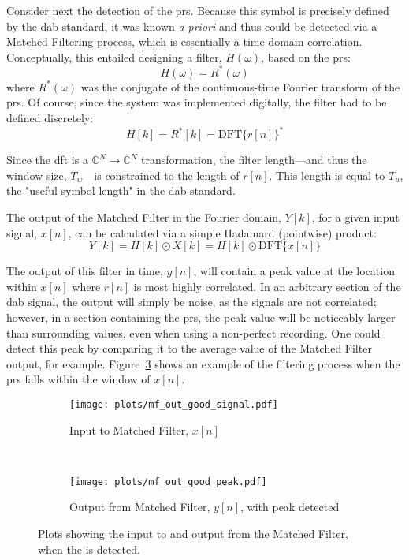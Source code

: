 \documentclass[class=report,11pt,crop=false]{standalone}
\begin{document}
Consider next the detection of the \gls{prs}. Because this symbol is precisely defined by the \gls{dab} standard, it was known \emph{a priori} and thus could be detected via a Matched Filtering process, which is essentially a time-domain correlation. Conceptually, this entailed designing a filter, \(H(\omega)\), based on the \gls{prs}:
\begin{equation}
  H(\omega) = R^*(\omega)
\end{equation}
where \(R^*(\omega)\) was the conjugate of the continuous-time Fourier transform of the \gls{prs}. Of course, since the system was implemented digitally, the filter had to be defined discretely:
\begin{equation}
  H[k] = R^*[k] = \mathrm{DFT} \{ r[n] \}^*
\end{equation}

Since the \gls{dft} is a \(\mathbb{C}^N \rightarrow \mathbb{C}^N\) transformation, the filter length---and thus the window size, \(T_w\)---is constrained to the length of \(r[n]\). This length is equal to \(T_u\), the "useful symbol length" in the \gls{dab} standard.

The output of the Matched Filter in the Fourier domain, \(Y[k]\), for a given input signal, \(x[n]\), can be calculated via a simple Hadamard (pointwise) product:
\begin{equation}
  Y[k] = H[k] \odot X[k] = H[k] \odot \mathrm{DFT} \{ x[n] \}
\end{equation}

The output of this filter in time, \(y[n]\), will contain a peak value at the location within \(x[n]\) where \(r[n]\) is most highly correlated. In an arbitrary section of the \gls{dab} signal, the output will simply be noise, as the signals are not correlated; however, in a section containing the \gls{prs}, the peak value will be noticeably larger than surrounding values, even when using a non-perfect recording. One could detect this peak by comparing it to the average value of the Matched Filter output, for example. Figure~\ref{fig:mf_out_good} shows an example of the filtering process when the \gls{prs} falls within the window of \(x[n]\).

\begin{figure}[htbp]
  \centering
  \captionsetup{type=figure}
  \begin{subfigure}[t]{\textwidth}
    \centering
    \captionsetup{type=figure}
    \texttt{[image: plots/mf\_out\_good\_signal.pdf]}
    \caption{Input to Matched Filter, \(x[n]\)}
    \label{fig:mf_out_good_signal}
  \end{subfigure}%
  \\
  \begin{subfigure}[t]{\textwidth}
    \centering
    \captionsetup{type=figure}
    \texttt{[image: plots/mf\_out\_good\_peak.pdf]}
    \caption{Output from Matched Filter, \(y[n]\), with peak detected}
    \label{fig:mf_out_good_peak}
  \end{subfigure}
  \caption{Plots showing the input to and output from the Matched Filter, when the  is detected.}
  \label{fig:mf_out_good}
\end{figure}
\end{document}
